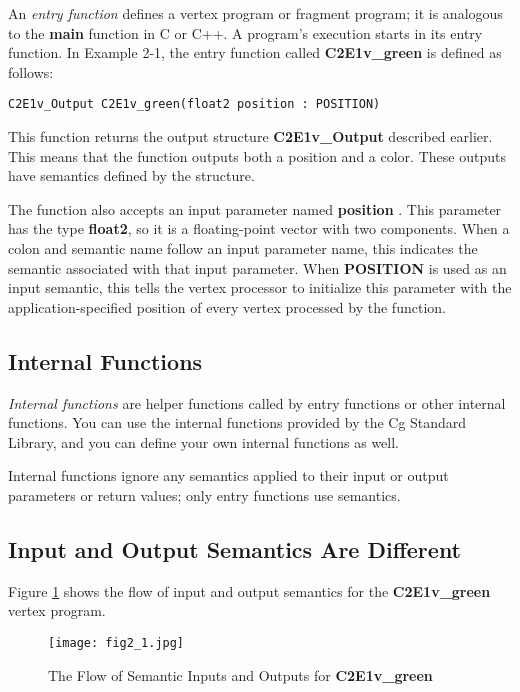 \documentclass[../main.tex]{subfiles}
\begin{document}
An \textit{entry function} defines a vertex program or fragment program; it is analogous to the \textbf{main} function in C or C++. A program's execution starts in its entry function. In Example 2-1, the entry function called \textbf{C2E1v_green} is defined as follows:

\FloatBarrier
\begin{lstlisting}
C2E1v_Output C2E1v_green(float2 position : POSITION)
\end{lstlisting}
\FloatBarrier

This function returns the output structure \textbf{C2E1v_Output} described earlier. This means that the function outputs both a position and a color. These outputs have semantics defined by the structure.

The function also accepts an input parameter named \textbf{position} . This parameter has the type \textbf{float2}, so it is a floating-point vector with two components. When a colon and semantic name follow an input parameter name, this indicates the semantic associated with that input parameter. When \textbf{POSITION} is used as an input semantic, this tells the vertex processor to initialize this parameter with the application-specified position of every vertex processed by the function.

\subsection*{Internal Functions}

\textit{Internal functions} are helper functions called by entry functions or other internal functions. You can use the internal functions provided by the Cg Standard Library, and you can define your own internal functions as well.

Internal functions ignore any semantics applied to their input or output parameters or return values; only entry functions use semantics.

\subsection{Input and Output Semantics Are Different}

Figure \ref{fig:2-1} shows the flow of input and output semantics for the \textbf{C2E1v_green} vertex program.

\begin{figure}
    \centering
    \texttt{[image: fig2\_1.jpg]}
    \caption{The Flow of Semantic Inputs and Outputs for \textbf{C2E1v_green}}
    \label{fig:2-1}
\end{figure}
\end{document}
